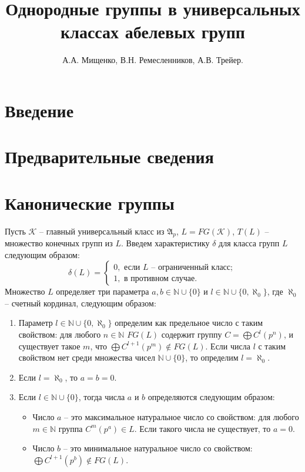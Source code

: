 \documentclass[12pt]{extarticle} %
\title{Однородные группы в универсальных классах абелевых групп}
\author{А.А. Мищенко, В.Н. Ремесленников, А.В. Трейер.}
\def\A{{\mathfrak{A}}}
\def\K{{\mathcal{K}}}
\def\N{{\mathbb{N}}}
\begin{document}
\maketitle
\tableofcontents
\listoftodos



\section{Введение}

\section{Предварительные сведения}

\section{Канонические группы}


Пусть $\K$ -- главный универсальный класс из $\A_p$, $L = FG(\K)$, $T(L)$ -- множество конечных групп из $L$. Введем характеристику $\delta$ для класса групп $L$ следующим образом:
$$\delta(L) = \left\lbrace 
\begin{array}{l}  
0, \text{ если } L \text{ -- ограниченный класс}; \\ 
1, \text{ в противном случае.}
\end{array} 
\right.$$
Множество $L$ определяет три параметра $a,b \in \N \cup \{0\}$ и $l \in \N \cup \{0, \aleph_0 \}$, где $\aleph_0$ -- счетный кординал, следующим образом:
\begin{enumerate}
\item Параметр $l \in \N \cup \{0, \aleph_0\}$ определим как предельное число с таким свойством: для любого $n \in \N$ $FG(L)$ содержит группу $C = \bigoplus C^l(p^n)$, и существует такое $m$, что $\bigoplus C^{l+1}(p^m) \notin FG(L)$. Если числа $l$ с таким свойством нет среди множества чисел $\N \cup \{0\}$, то определим $l = \aleph_0$.
\item Если $l = \aleph_0$, то $a = b = 0$.
\item Если $l \in \N \cup \{0\}$, тогда числа $a$ и $b$ определяются следующим образом:
\begin{itemize}
 \item Число $a$ -- это максимальное натуральное число со свойством: для любого $m \in \N$ группа $C^m(p^a) \in L$. Если такого числа не существует, то $a = 0$.
 \item Число $b$ -- это минимальное натуральное число со свойством: $\bigoplus C^{l+1}(p^b) \notin FG(L)$.
\end{itemize} 
\end{enumerate}
\end{document}
